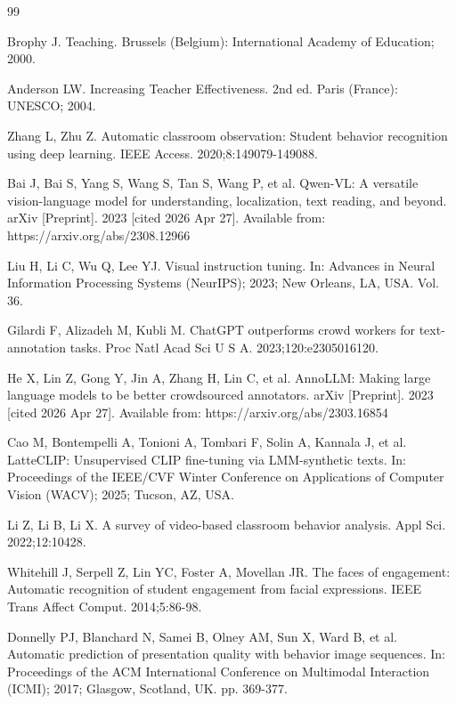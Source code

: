 \documentclass{ieeeaccess}
\begin{document}
\begin{thebibliography}{99}

Brophy J. Teaching. Brussels (Belgium): International Academy of
Education; 2000.

Anderson LW. Increasing Teacher Effectiveness. 2nd ed. Paris
(France): UNESCO; 2004.

Zhang L, Zhu Z.
Automatic classroom observation: Student behavior recognition using
deep learning. IEEE Access. 2020;8:149079-149088.

Bai J, Bai S, Yang S, Wang S, Tan S, Wang P, et al.
Qwen-VL: A versatile vision-language model for understanding, localization,
text reading, and beyond. arXiv [Preprint]. 2023 [cited 2026 Apr 27].
Available from: https://arxiv.org/abs/2308.12966

Liu H, Li C, Wu Q, Lee YJ.
Visual instruction tuning.
In: Advances in Neural Information Processing Systems (NeurIPS);
2023; New Orleans, LA, USA. Vol. 36.

Gilardi F, Alizadeh M, Kubli M.
ChatGPT outperforms crowd workers for text-annotation tasks.
Proc Natl Acad Sci U S A. 2023;120:e2305016120.

He X, Lin Z, Gong Y, Jin A, Zhang H, Lin C, et al.
AnnoLLM: Making large language models to be better crowdsourced annotators.
arXiv [Preprint]. 2023 [cited 2026 Apr 27]. Available from:
https://arxiv.org/abs/2303.16854

Cao M, Bontempelli A, Tonioni A, Tombari F, Solin A, Kannala J, et al.
LatteCLIP: Unsupervised CLIP fine-tuning via LMM-synthetic texts.
In: Proceedings of the IEEE/CVF Winter Conference on Applications of
Computer Vision (WACV); 2025; Tucson, AZ, USA.

Li Z, Li B, Li X.
A survey of video-based classroom behavior analysis.
Appl Sci. 2022;12:10428.

Whitehill J, Serpell Z, Lin YC, Foster A, Movellan JR.
The faces of engagement: Automatic recognition of student
engagement from facial expressions.
IEEE Trans Affect Comput. 2014;5:86-98.

Donnelly PJ, Blanchard N, Samei B, Olney AM, Sun X, Ward B, et al.
Automatic prediction of presentation quality with behavior image
sequences.
In: Proceedings of the ACM International Conference on Multimodal
Interaction (ICMI); 2017; Glasgow, Scotland, UK. pp. 369-377.


\end{thebibliography}
\end{document}
